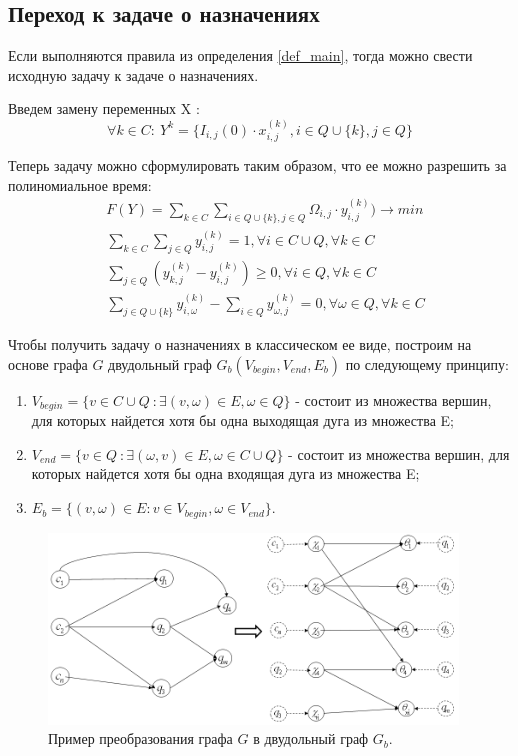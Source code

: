 \documentclass[]{TAACpaper}
\begin{document}
\subsection{Переход к задаче о назначениях}
Если выполняются правила из определения \ref{def_main}, тогда можно свести исходную задачу к задаче о назначениях.

Введем замену переменных X :
\begin{equation} \label{y_replace}
\forall k \in C: ~Y^k = \{ I_{i,j}(0) \cdot x^{(k)}_{i,j} , i \in Q \cup  \{k\} , j \in Q  \}
\end{equation}

Теперь задачу можно сформулировать таким образом, что ее можно разрешить за полиномиальное время:
\begin{align} 
  &F(Y) = 
    \sum_{k \in C}
     \sum_{i \in Q \cup  \{k\},j \in Q} 
     \Omega_{i,j}\cdot y^{(k)}_{i,j})
     \to min\\
& \sum_{k \in C}\sum_{j \in Q}y^{(k)}_{i,j} = 1, 
  \forall i \in C \cup Q, \forall k \in C \label{mod_cond_1}\\ 
& \sum_{j \in Q} ( 
       y^{(k)}_{k,j} -y^{(k)}_{i,j} ) \geq 0, 
       \forall i \in Q ,  \forall k \in C \label{mod_cond_2}\\
& \sum_{j \in Q \cup  \{k\}} y^{(k)}_{i,\omega} - 
  \sum_{i \in Q} y^{(k)}_{\omega,j} = 0, 
  \forall \omega \in Q ,  \forall k \in C \label{mod_cond_3}
\end{align}

Чтобы получить задачу о назначениях в классическом ее виде, построим на основе графа $G$ двудольный граф $G_b(V_{begin},V_{end},E_b)$ по следующему принципу:
\begin{enumerate}
\item $V_{begin} = \{v \in C \cup Q\ : \exists (v,\omega) \in E, \omega \in Q \}$ - состоит из множества вершин, для которых найдется хотя бы одна выходящая дуга из множества E;
\item $V_{end} = \{v  \in Q\ : \exists (\omega,v) \in E, \omega \in C \cup Q \}$ - состоит из множества вершин, для которых найдется хотя бы одна входящая дуга из множества E;
\item $E_b = \{(v,\omega) \in E: v \in V_{begin}, \omega \in V_{end} \}$.
\end{enumerate}

\begin{figure}[h]
\hfil\includegraphics[height=2.0in]{sign_graph}\hfil
\caption
{
  Пример преобразования графа $G$ в двудольный граф $G_b$.
}
\label{aba:fig1}
\end{figure}
\end{document}
